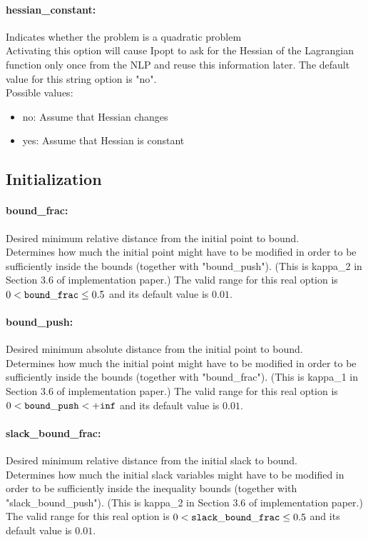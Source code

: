 \paragraph{hessian\_constant:}\label{sec:hessian_constant} Indicates whether the problem is a quadratic problem $\;$ \\
 Activating this option will cause Ipopt to ask
for the Hessian of the Lagrangian function only
once from the NLP and reuse this information
later.
The default value for this string option is "no".
\\ 
Possible values:
\begin{itemize}
   \item no: Assume that Hessian changes
   \item yes: Assume that Hessian is constant
\end{itemize}

\subsection{Initialization}

\paragraph{bound\_frac:}\label{sec:bound_frac} Desired minimum relative distance from the initial point to bound. $\;$ \\
 Determines how much the initial point might have
to be modified in order to be sufficiently inside
the bounds (together with "bound\_push").  (This
is kappa\_2 in Section 3.6 of implementation
paper.) The valid range for this real option is 
$0 <  {\tt bound\_frac } \le 0.5$
and its default value is $0.01$.


\paragraph{bound\_push:}\label{sec:bound_push} Desired minimum absolute distance from the initial point to bound. $\;$ \\
 Determines how much the initial point might have
to be modified in order to be sufficiently inside
the bounds (together with "bound\_frac").  (This
is kappa\_1 in Section 3.6 of implementation
paper.) The valid range for this real option is 
$0 <  {\tt bound\_push } <  {\tt +inf}$
and its default value is $0.01$.


\paragraph{slack\_bound\_frac:}\label{sec:slack_bound_frac} Desired minimum relative distance from the initial slack to bound. $\;$ \\
 Determines how much the initial slack variables
might have to be modified in order to be
sufficiently inside the inequality bounds
(together with "slack\_bound\_push").  (This is
kappa\_2 in Section 3.6 of implementation paper.) The valid range for this real option is 
$0 <  {\tt slack\_bound\_frac } \le 0.5$
and its default value is $0.01$.


